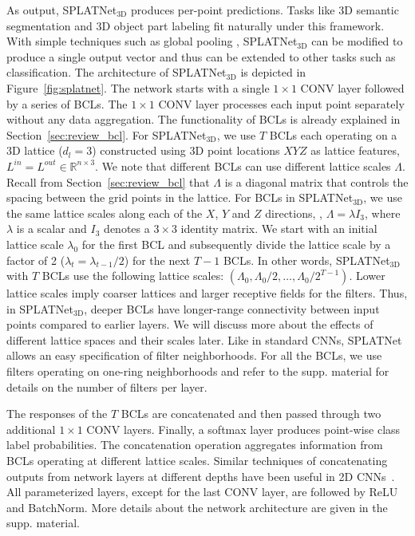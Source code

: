 \documentclass[10pt,twocolumn,letterpaper]{article}
\def\modelthree{SPLATNet$_{\text{3D}}$\xspace}
\begin{document}
As output, SPLATNet$_{\text{3D}}$ produces per-point predictions. Tasks like 3D semantic segmentation and 
3D object part labeling fit naturally under this framework. 
With simple techniques such as global pooling \cite{qi2017pointnet}, SPLATNet$_{\text{3D}}$ can be modified to 
produce a single output vector and thus can be extended to other tasks such as classification.
The architecture of SPLATNet$_{\text{3D}}$ is depicted in Figure~\ref{fig:splatnet}. The network starts with a single $1\times1$ CONV layer followed by a series of BCLs. The $1\times1$ CONV layer processes
each input point separately without any data aggregation. The functionality of BCLs is already explained
in Section~\ref{sec:review_bcl}. For SPLATNet$_{\text{3D}}$, we use $T$ BCLs each operating on
a 3D lattice ($d_l=3$) constructed using 
3D point locations $XYZ$ as lattice features,
$L^{in} = L^{out} \in \mathbb{R}^{n \times 3}$. 
We note that different BCLs can use different lattice scales $\Lambda$.
Recall from Section~\ref{sec:review_bcl} that $\Lambda$ is a diagonal matrix that controls the spacing between the grid points in the lattice. For BCLs in \modelthree, we use the same lattice scales along each of the $X$, $Y$ and $Z$ directions, \ie, $\Lambda = \lambda I_3$, where $\lambda$ is a scalar and $I_3$ denotes a $3\times 3$ identity matrix.
We start with an initial lattice scale $\lambda_0$ for the first BCL and subsequently divide the lattice scale by a factor of 2 ($\lambda_t = \lambda_{t-1} / 2$) 
for the next $T-1$ BCLs. 
In other words, \modelthree with $T$ BCLs use the following lattice scales: $(\Lambda_0, \Lambda_0/2, \dots, \Lambda_0/2^{T-1})$.
Lower lattice scales imply coarser lattices and larger receptive fields for the filters. 
Thus, in SPLATNet$_{\text{3D}}$, deeper BCLs have longer-range connectivity between input points compared 
to earlier layers. We will discuss more about the effects of different lattice spaces and their scales later.
Like in standard CNNs, SPLATNet allows an easy specification of filter neighborhoods.
For all the BCLs, we use filters operating on 
one-ring neighborhoods
and refer to the supp. material
for details on the number of filters per layer.

The responses of the $T$ BCLs are concatenated and then passed through two additional $1\times1$ CONV layers. 
Finally, a softmax layer produces point-wise class label probabilities.
The concatenation operation aggregates information from BCLs operating at different lattice scales. 
Similar techniques of concatenating outputs from network layers at different depths
have been useful in 2D CNNs~\cite{hariharan2015hypercolumns}.
All parameterized layers, except for the last CONV layer, are followed by ReLU and BatchNorm.
More details about the network architecture are given in the supp. material.
\end{document}
